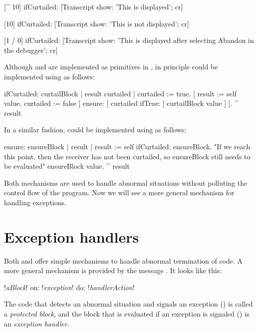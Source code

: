 \documentclass[a4paper,10pt,twoside]{book}
\begin{document}
\begin{code}{}
[^ 10] ifCurtailed: [Transcript show: 'This is displayed'; cr] 

[10] ifCurtailed: [Transcript show: 'This is not displayed'; cr] 

[1 / 0] ifCurtailed: [Transcript show: 'This is displayed after selecting Abandon in the debugger'; cr]
\end{code}

Although  and  are implemented as primitives in \pharo, in principle  could be implemented using  as follows:

\begin{code}{}
ifCurtailed: curtailBlock
	| result curtailed |
	curtailed := true.
	[	result := self value.
		curtailed := false
	]	ensure: [ curtailed ifTrue: [ curtailBlock value ] ].
	^ result
\end{code}

In a similar fashion,  could be implemented using  as follows:

\begin{code}{}
ensure: ensureBlock
	| result |
	result := self ifCurtailed: ensureBlock.
	"If we reach this point, then the receiver has not been curtailed,
	so ensureBlock still needs to be evaluated"
	ensureBlock value.
	^ result
\end{code}

Both mechanisms are used to handle abnormal situations without polluting the control flow of the program.
Now we will see a more general mechanism for handling exceptions.

\section{Exception handlers}

Both  and  offer simple mechanisms to handle abnormal termination of code. A more general mechanism is provided by the message . It looks like this:
\begin{code}{}
!\emph{aBlock}! on: !\emph{exception}! do: !\emph{handlerAction}!
\end{code}
\noindent
The code that detects an abnormal situation and signals an exception () is called a \emph{protected block}, and the block that is evaluated if an exception is signaled () is  an \emph{exception handler}.
\end{document}
